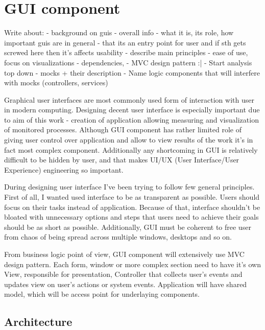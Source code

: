  
%


\section{GUI component}
\label{sec:arch_gui}

Write about:
- background on guis
- overall info - what it is, its role, how important guis are in general - that its an entry point for user and if sth
gets screwed here then it's affects usability 
- describe main principles - ease of use, focus on visualizations 
- dependencies,
- MVC design pattern :|
- Start analysis top down - mocks + their description
- Name logic components that will interfere with mocks (controllers, services)

Graphical user interfaces are most commonly used form of interaction with user in modern computing. Designing decent
user interface is especially important due to aim of this work - creation of application allowing measuring and
visualization of monitored processes. Although GUI component has rather limited role of giving user control over
application and allow to view results of the work it's in fact most complex component. Additionally any shortcoming in
GUI is relatively difficult to be hidden by user, and that makes UI/UX (User Interface/User Experience) engineering so
important.

During designing user interface I've been trying to follow few general principles. First of all, I wanted used
interface to be as transparent as possible. Users should focus on their tasks instead of application. Because of that,
interface shouldn't be bloated with unnecessary options and steps that users need to achieve their goals should be as
short as possible. Additionally, GUI must be coherent to free user from chaos of being spread across multiple windows,
desktops and so on. 

From business logic point of view, GUI component will extensively use MVC design pattern. Each form, window or more
complex section need to have it's own View, responsible for presentation, Controller that collects user's events and
updates view on user's actions or system events. Application will have shared model, which will be access point for
underlaying components.
 


\subsection{Architecture}

